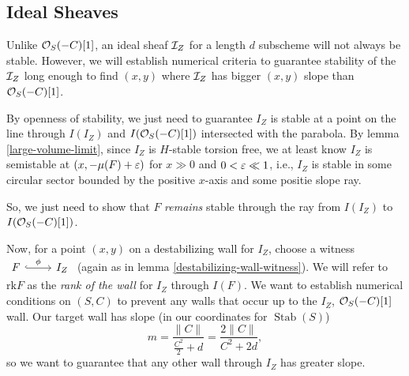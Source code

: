 \documentclass[12pt]{article}
\DeclareMathOperator{\Stab}{Stab}
\newcommand{\rk}{\mathrm{rk}}
\begin{document}
\subsection{Ideal Sheaves}

Unlike $\mathcal{O}_S(-C)[1]$, an ideal sheaf $\mathcal{I}_Z$ for a length $d$ subscheme will not always be stable. However, we will establish numerical criteria to guarantee stability of the $\mathcal{I}_Z$ long enough to find $(x,y)$ where $\mathcal{I}_Z$ has bigger $(x,y)$ slope than $\mathcal{O}_S(-C)[1]$.

By openness of stability, we just need to guarantee $I_Z$ is stable at a point on the line through $I(I_Z)$ and $I(\mathcal{O}_S(-C)[1])$ intersected with the parabola. By lemma \ref{large-volume-limit}, since $I_Z$ is $H$-stable torsion free, we at least know $I_Z$ is semistable at $(x,-\mu(F)+\varepsilon)$ for $x\gg 0$ and $0<\varepsilon \ll 1$, i.e., $I_Z$ is stable in some circular sector bounded by the positive $x$-axis and some positie slope ray.

So, we just need to show that $F$ \textit{remains} stable through the ray from $I(I_Z)$ to $I(\mathcal{O}_S(-C)[1])$.

\begin{center}
\end{center}

Now, for a point $(x,y)$ on a destabilizing wall for $I_Z$, choose a witness \(
    \begin{tikzcd} F \rar[hook,"\phi"]& I_Z\end{tikzcd}
\) (again as in lemma \ref{destabilizing-wall-witness}). We will refer to $\rk F$ as the \textit{rank of the wall} for $I_Z$ through $I(F)$. We want to establish numerical conditions on $(S,C)$ to prevent any walls that occur up to the $I_Z$, $\mathcal{O}_S(-C)[1]$ wall. Our target wall has slope (in our coordinates for $\Stab(S)$)
\[m = \frac{\|C\|}{\frac{C^2}{2}+d} = \frac{2\|C\|}{C^2+2d},\]
so we want to guarantee that any other wall through $I_Z$ has greater slope.
\end{document}
